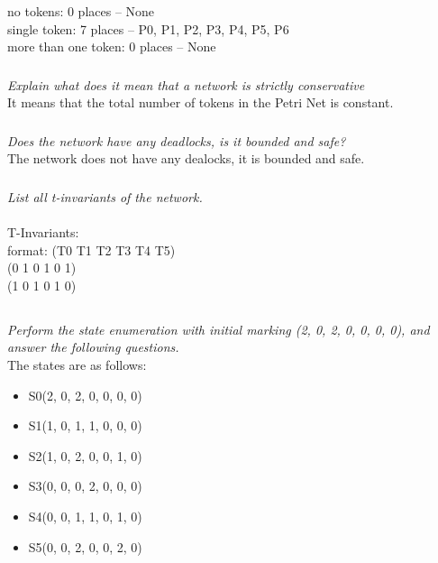 \documentclass[letterpaper]{article}
\begin{document}
\noindent no tokens: 0 places -- None\\
single token: 7 places -- P0, P1, P2, P3, P4, P5, P6\\
more than one token: 0 places -- None\\

\subsubsection{}
\textit{Explain what does it mean that a network is strictly conservative}\\

It means that the total number of tokens in the Petri Net is constant.

\subsubsection{}
\textit{Does the network have any deadlocks, is it bounded and safe?}\\

The network does not have any dealocks, it is bounded and safe.

\subsubsection{}
\textit{List all t-invariants of the network.}\\ \\
T-Invariants: \\
format: (T0 T1 T2 T3 T4 T5) \\

\noindent (0 1 0 1 0 1) \\
(1 0 1 0 1 0) \\

\subsection{}
\textit{Perform the state enumeration with initial marking (2, 0, 2, 0, 0, 0, 0), and answer the following questions.}\\

The states are as follows:
\begin{itemize}
 \item S0(2, 0, 2, 0, 0, 0, 0)
 \item S1(1, 0, 1, 1, 0, 0, 0)
 \item S2(1, 0, 2, 0, 0, 1, 0)
 \item S3(0, 0, 0, 2, 0, 0, 0)
 \item S4(0, 0, 1, 1, 0, 1, 0)
 \item S5(0, 0, 2, 0, 0, 2, 0)
\end{itemize}
\end{document}
